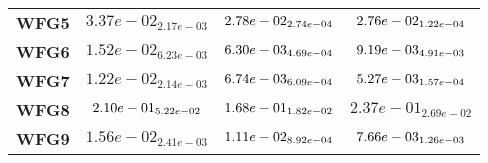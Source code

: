 \documentclass{article}
\begin{document}
\begin{table}[!htp]
\begin{scriptsize}
\begin{tabular}{c|ccc}
      \textbf{WFG5} & $3.37e-02_{2.17e-03} $ & $ \cellcolor{gray25} 2.78e-02_{2.74e-04} $ & $ \cellcolor{gray95} 2.76e-02_{1.22e-04}$ \\
      \textbf{WFG6} & $1.52e-02_{6.23e-03} $ & $ \cellcolor{gray95} 6.30e-03_{4.69e-04} $ & $ \cellcolor{gray25} 9.19e-03_{4.91e-03}$ \\
      \textbf{WFG7} & $1.22e-02_{2.14e-03} $ & $ \cellcolor{gray25} 6.74e-03_{6.09e-04} $ & $ \cellcolor{gray95} 5.27e-03_{1.57e-04}$ \\
      \textbf{WFG8} & $\cellcolor{gray25} 2.10e-01_{5.22e-02} $ & $ \cellcolor{gray95} 1.68e-01_{1.82e-02} $ & $ 2.37e-01_{2.69e-02}$ \\
      \textbf{WFG9} & $1.56e-02_{2.41e-03} $ & $ \cellcolor{gray25} 1.11e-02_{8.92e-04} $ & $ \cellcolor{gray95} 7.66e-03_{1.26e-03}$ \\
  \end{tabular}
  \end{scriptsize}
\end{table}
\end{document}
